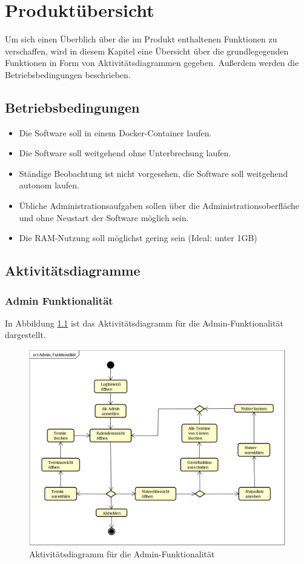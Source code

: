 
\chapter{Produktübersicht}
\label{chap:product_overview}
Um sich einen Überblich über die im Produkt enthaltenen Funktionen zu verschaffen, wird in diesem Kapitel eine Übersicht über die grundlegegenden Funktionen in Form von Aktivitätsdiagrammen gegeben.
Außerdem werden die Betriebsbedingungen beschrieben.
\section{Betriebsbedingungen}
\begin{itemize}
    \item Die Software soll in einem \gls{Docker}-\gls{Container} laufen.
    \item Die Software soll weitgehend ohne Unterbrechung laufen.
    \item Ständige Beobachtung ist nicht vorgesehen, die Software soll weitgehend autonom laufen.
    \item Übliche Administrationsaufgaben sollen über die Administrationsoberfläche und ohne Neustart der Software möglich sein.
    \item Die \gls{RAM}-Nutzung soll möglichst gering sein (Ideal: unter 1GB)
\end{itemize}

\newpage
\section{Aktivitätsdiagramme}

\subsection{Admin Funktionalität}
In Abbildung \ref{fig:activity_diagram_admin} ist das Aktivitätsdiagramm für die Admin-Funktionalität dargestellt.
\begin{figure}[ht]
    \centering
    \includegraphics[scale=0.2]{figures/activitydiagrams/adminfunk}
    \caption{Aktivitätsdiagramm für die Admin-Funktionalität}
    \label{fig:activity_diagram_admin}
\end{figure}
\clearpage
